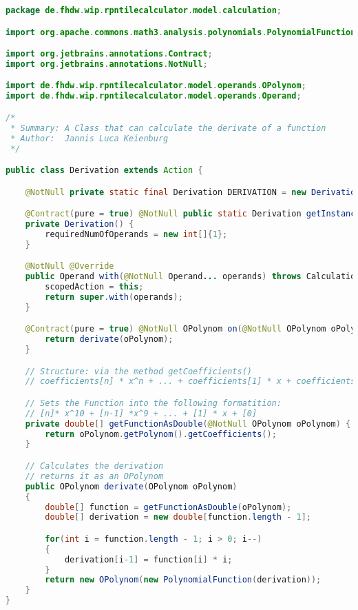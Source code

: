 \begin{lstlisting}[caption=Derivation (Keienburg),label=list:Derivation,language=Java]
package de.fhdw.wip.rpntilecalculator.model.calculation;

import org.apache.commons.math3.analysis.polynomials.PolynomialFunction;

import org.jetbrains.annotations.Contract;
import org.jetbrains.annotations.NotNull;

import de.fhdw.wip.rpntilecalculator.model.operands.OPolynom;
import de.fhdw.wip.rpntilecalculator.model.operands.Operand;

/*
 * Summary: A Class that can calculate the derivate of a function
 * Author:  Jannis Luca Keienburg
 */

public class Derivation extends Action {

    @NotNull private static final Derivation DERIVATION = new Derivation();

    @Contract(pure = true) @NotNull public static Derivation getInstance() { return DERIVATION; }
    private Derivation() {
        requiredNumOfOperands = new int[]{1};
    }

    @NotNull @Override
    public Operand with(@NotNull Operand... operands) throws CalculationException {
        scopedAction = this;
        return super.with(operands);
    }

    @Contract(pure = true) @NotNull OPolynom on(@NotNull OPolynom oPolynom) {
        return derivate(oPolynom);
    }

    // Structure: via the method getCoefficients()
    // coefficients[n] * x^n + ... + coefficients[1] * x + coefficients[0]

    // Sets the Function into the following formatition:
    // [n]* x^10 + [n-1] *x^9 + ... + [1] * x + [0]
    private double[] getFunctionAsDouble(@NotNull OPolynom oPolynom) {
        return oPolynom.getPolynom().getCoefficients();
    }

    // Calculates the derivation
    // returns it as an OPolynom
    public OPolynom derivate(OPolynom oPolynom)
    {
        double[] function = getFunctionAsDouble(oPolynom);
        double[] derivation = new double[function.length - 1];

        for(int i = function.length - 1; i > 0; i--)
        {
            derivation[i-1] = function[i] * i;
        }
        return new OPolynom(new PolynomialFunction(derivation));
    }
}
\end{lstlisting}    

